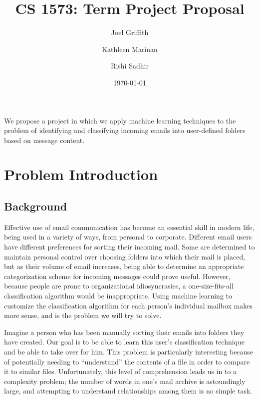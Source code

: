 \documentclass[11pt]{article}
\title{CS 1573: Term Project Proposal}
\author{Joel Griffith\and Kathleen Marinan\and Rishi Sadhir}
\date{\today}
\begin{document}
\maketitle

\setcounter{tocdepth}{3}
\tableofcontents
\vspace*{1cm}


We propose a project in which we apply machine learning techniques to the problem of identifying and classifying incoming emails into user-defined folders based on message content.

\section{Problem Introduction}
\label{sec-1}

\subsection{Background}
\label{sec-1-1}
Effective use of email communication has become an essential skill in modern life, being used in a variety of ways, from personal to corporate.  Different email users have different preferences for sorting their incoming mail.  Some are determined to maintain personal control over choosing folders into which their mail is placed, but as their volume of email increases, being able to determine an appropriate categorization scheme for incoming messages could prove useful.  However, because people are prone to organizational idiosyncrasies, a one-size-fits-all classification algorithm would be inappropriate.  Using machine learning to customize the classification algorithm for each person's individual mailbox makes more sense, and is the problem we will try to solve.

Imagine a person who has been manually sorting their emails into folders they have created. Our goal is to be able to learn this user’s classification technique and be able to take over for him. This problem is particularly interesting because of potentially needing to “understand” the contents of a file in order to compare it to similar files. 
Unfortunately, this level of comprehension leads us in to a complexity problem; the number of words in one’s mail archive is astoundingly large, and attempting to understand relationships among them is no simple task.
\end{document}
